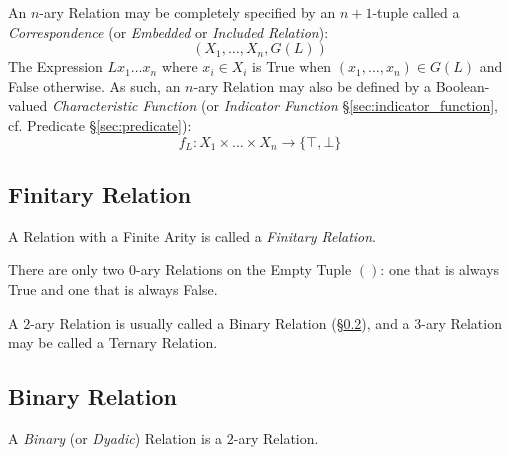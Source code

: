 An $n$-ary Relation may be completely specified by an $n + 1$-tuple
called a \emph{Correspondence} (or \emph{Embedded} or \emph{Included
  Relation}):
\[
  (X_1, \ldots, X_n, G(L))
\]
The Expression $L x_1 \ldots x_n$ where $x_i \in X_i$ is True when
$(x_1, \ldots, x_n) \in G(L)$ and False otherwise. As such, an $n$-ary
Relation may also be defined by a Boolean-valued \emph{Characteristic
  Function} (or \emph{Indicator Function}
\S\ref{sec:indicator_function}, cf. Predicate \S\ref{sec:predicate}):
\[
  f_L : X_1 \times \ldots \times X_n \rightarrow \{\top,\bot\}
\]



\subsection{Finitary Relation}\label{sec:finitary_relation}

A Relation with a Finite Arity is called a \emph{Finitary Relation}.

There are only two $0$-ary Relations on the Empty Tuple $()$: one that
is always True and one that is always False.

A $2$-ary Relation is usually called a Binary Relation
(\S\ref{sec:binary_relation}), and a $3$-ary Relation may be called a
Ternary Relation.



\subsection{Binary Relation}\label{sec:binary_relation}

A \emph{Binary} (or \emph{Dyadic}) Relation is a $2$-ary Relation.

